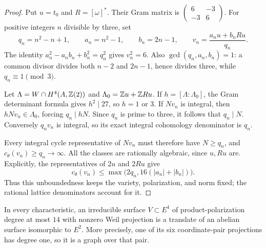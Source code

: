 \begin{proof}
Put $u=t_0$ and $R=[\omega]^*$. Their Gram matrix is
$\left(\begin{smallmatrix}6&-3\\-3&6\end{smallmatrix}\right)$.
For positive integers $n$ divisible by three, set
\[
 q_n=n^2-n+1,\qquad a_n=n^2-1,\qquad b_n=2n-1,\qquad
 v_n=\frac{a_nu+b_nRu}{q_n}.
\]
The identity $a_n^2-a_nb_n+b_n^2=q_n^2$ gives $v_n^2=6$.
Also $\gcd(q_n,a_n,b_n)=1$: a common divisor divides both $n-2$
and $2n-1$, hence divides three, while $q_n\equiv1\pmod3$.

Let $\Lambda=W\cap H^4(A,\mathbb Z(2))$ and
$\Lambda_0=\mathbb Z u+\mathbb Z Ru$. If $h=[\Lambda:\Lambda_0]$, the Gram
determinant formula gives $h^2\mid27$, so $h=1$ or $3$.
If $Nv_n$ is integral, then $hNv_n\in\Lambda_0$, forcing
$q_n\mid hN$. Since $q_n$ is prime to three, it follows that
$q_n\mid N$. Conversely $q_nv_n$ is integral, so its exact integral
cohomology denominator is $q_n$.

Every integral cycle representative of $Nv_n$ must therefore have
$N\geq q_n$, and $c_\theta(v_n)\geq q_n\to\infty$.
All the classes are rationally algebraic, since $u,Ru$ are. Explicitly,
the representatives of $2u$ and $2Ru$ give
\[
 c_\theta(v_n)\leq
 \max\bigl(2q_n,16(|a_n|+|b_n|)\bigr).
\]
Thus this unboundedness keeps the variety, polarization, and norm fixed;
the rational lattice denominators account for it.
\end{proof}

\begin{lemma}
In every characteristic, an irreducible surface $V\subset E^4$ of
product-polarization degree at most $14$ with nonzero Weil projection
is a translate of an abelian surface isomorphic to $E^2$. More precisely,
one of its six coordinate-pair projections has degree one, so it is a
graph over that pair.
\end{lemma}

